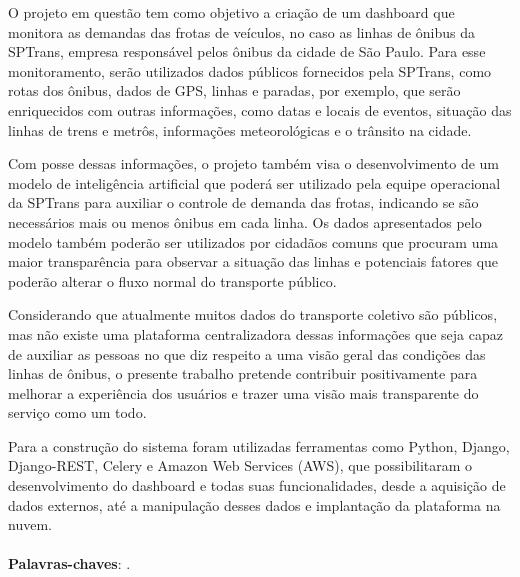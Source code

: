 \begin{resumo}
\indent
\par O projeto em questão tem como objetivo a criação de um dashboard que monitora as demandas das   frotas   de veículos, no caso as linhas de ônibus da SPTrans, empresa responsável pelos ônibus da cidade de São Paulo. Para esse monitoramento, serão utilizados dados públicos fornecidos pela SPTrans, como rotas dos ônibus, dados de GPS, linhas e paradas, por exemplo, que serão enriquecidos com outras informações, como datas e locais de eventos, situação das linhas de trens e metrôs, informações meteorológicas e o trânsito na cidade.
\par Com posse dessas informações, o projeto também visa o desenvolvimento de um modelo de inteligência artificial que poderá ser utilizado pela equipe operacional da SPTrans para auxiliar o controle de demanda das frotas, indicando se são necessários mais ou menos ônibus em cada linha. Os dados apresentados pelo modelo também poderão ser utilizados por cidadãos comuns que procuram uma maior transparência para observar a situação das linhas e potenciais fatores que poderão alterar o fluxo normal do transporte público.
\par Considerando que atualmente muitos dados do transporte coletivo são públicos, mas não existe uma plataforma centralizadora dessas informações que seja capaz de auxiliar as pessoas no que diz respeito a uma visão geral das condições das linhas de ônibus, o presente trabalho pretende contribuir positivamente para melhorar a experiência dos usuários e trazer uma visão mais transparente do serviço como um todo.
\par Para a construção do sistema foram utilizadas ferramentas como Python, Django, Django-REST, Celery e Amazon Web Services (AWS), que possibilitaram o desenvolvimento do dashboard e todas suas funcionalidades, desde a aquisição de dados externos, até a manipulação desses dados e implantação da plataforma na nuvem.
\\
\\
\textbf{Palavras-chaves}: \PalavraChaveA.~

\end{resumo}
